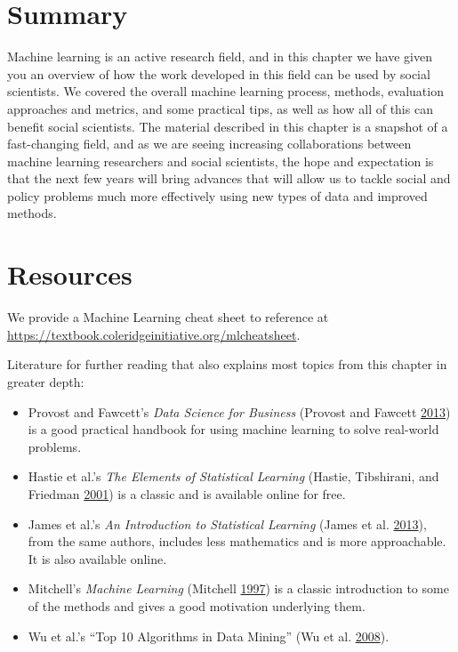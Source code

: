 \documentclass[]{krantz}
\begin{document}
\section{Summary}\label{summary-4}

Machine learning is an active research field, and in this chapter we
have given you an overview of how the work developed in this field can
be used by social scientists. We covered the overall machine learning
process, methods, evaluation approaches and metrics, and some practical
tips, as well as how all of this can benefit social scientists. The
material described in this chapter is a snapshot of a fast-changing
field, and as we are seeing increasing collaborations between machine
learning researchers and social scientists, the hope and expectation is
that the next few years will bring advances that will allow us to tackle
social and policy problems much more effectively using new types of data
and improved methods.

\hypertarget{ml:res}{\section{Resources}\label{ml:res}}

We provide a Machine Learning cheat sheet to reference at
\url{https://textbook.coleridgeinitiative.org/mlcheatsheet}.

Literature for further reading that also explains most topics from this
chapter in greater depth:

\begin{itemize}
\item
  Provost and Fawcett's \emph{Data Science for Business} (Provost and
  Fawcett \protect\hyperlink{ref-FawcettProvost}{2013}) is a good
  practical handbook for using machine learning to solve real-world
  problems.
\item
  Hastie et al.'s \emph{The Elements of Statistical Learning} (Hastie,
  Tibshirani, and Friedman
  \protect\hyperlink{ref-HastieTibshirani}{2001}) is a classic and is
  available online for free.
\item
  James et al.'s \emph{An Introduction to Statistical Learning} (James
  et al. \protect\hyperlink{ref-james2013introduction}{2013}), from the
  same authors, includes less mathematics and is more approachable. It
  is also available online.
\item
  Mitchell's \emph{Machine Learning} (Mitchell
  \protect\hyperlink{ref-mitchell1997machine}{1997}) is a classic
  introduction to some of the methods and gives a good motivation
  underlying them.
\item
  Wu et al.'s ``Top 10 Algorithms in Data Mining'' (Wu et al.
  \protect\hyperlink{ref-wu2008top}{2008}).
\end{itemize}
\end{document}
